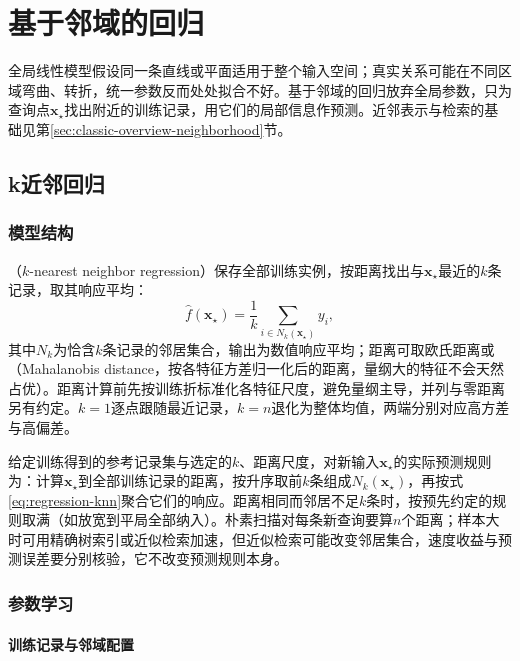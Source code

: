 \section{基于邻域的回归}
\label{sec:regression-instance}

全局线性模型假设同一条直线或平面适用于整个输入空间；真实关系可能在不同区域弯曲、转折，统一参数反而处处拟合不好。基于邻域的回归放弃全局参数，只为查询点$\bm{x}_\star$找出附近的训练记录，用它们的局部信息作预测。近邻表示与检索的基础见第\ref{sec:classic-overview-neighborhood}节。

\subsection{k近邻回归}
\label{sec:regression-knn}

\subsubsection{模型结构}
\label{sec:regression-knn-structure}

（$k$-nearest neighbor regression）保存全部训练实例，按距离找出与$\bm{x}_\star$最近的$k$条记录，取其响应平均：
\begin{equation}
  \widehat f(\bm{x}_\star)
  =\frac{1}{k}\sum_{i\in N_k(\bm{x}_\star)}y_i,
  \label{eq:regression-knn}
\end{equation}
其中$N_k$为恰含$k$条记录的邻居集合，输出为数值响应平均；距离可取欧氏距离或（Mahalanobis distance，按各特征方差归一化后的距离，量纲大的特征不会天然占优）。距离计算前先按训练折标准化各特征尺度，避免量纲主导，并列与零距离另有约定。$k=1$逐点跟随最近记录，$k=n$退化为整体均值，两端分别对应高方差与高偏差。

给定训练得到的参考记录集与选定的$k$、距离尺度，对新输入$\bm{x}_\star$的实际预测规则为：计算$\bm{x}_\star$到全部训练记录的距离，按升序取前$k$条组成$N_k(\bm{x}_\star)$，再按式\eqref{eq:regression-knn}聚合它们的响应。距离相同而邻居不足$k$条时，按预先约定的规则取满（如放宽到平局全部纳入）。朴素扫描对每条新查询要算$n$个距离；样本大时可用精确树索引或近似检索加速，但近似检索可能改变邻居集合，速度收益与预测误差要分别核验，它不改变预测规则本身。

\subsubsection{参数学习}
\label{sec:regression-knn-learning}

\paragraph{训练记录与邻域配置}

